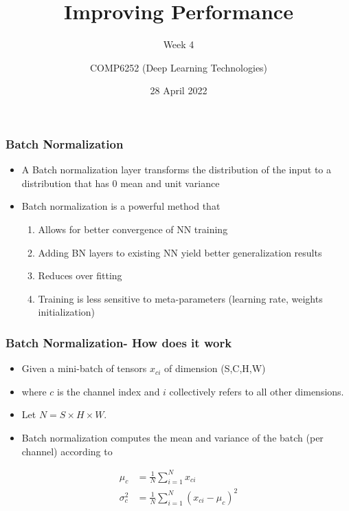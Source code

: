 \documentclass{beamer}
\begin{document}
\title{Improving Performance}
\subtitle{Week 4}
\author{COMP6252 (Deep Learning Technologies)}
 \date{28 April 2022}

\begin{frame}
    \placelogofalse %
    \titlepage
\end{frame}
    
\placelogotrue
\begin{frame}
    \frametitle{Batch Normalization}
\begin{itemize}
    \item A Batch normalization layer transforms the distribution of the input to a distribution that has 0 mean and unit variance
    \item Batch normalization is a powerful method that 
    \begin{enumerate}
        \item Allows for better convergence of NN training 
        \item Adding BN layers to existing NN yield better generalization results
        \item Reduces over fitting
        \item Training is less sensitive to meta-parameters (learning rate, weights initialization)
    \end{enumerate}
    
\end{itemize}
    

\end{frame}
\begin{frame}
    \frametitle{Batch Normalization- How does it work}
    \begin{itemize}
        \item Given a mini-batch of tensors $x_{ci}$ of dimension (S,C,H,W)
        \item  where $c$ is the channel index and $i$ collectively refers to all other dimensions. 
        \item  Let $N=S\times H\times W$.
        \item Batch normalization computes the mean and variance of the batch (per channel) according to
    \end{itemize}
        \begin{align*}
        \mu_c&=\frac{1}{N}\sum_{i=1}^N x_{ci}\\
        \sigma^2_c&=\frac{1}{N}\sum_{i=1}^N \left(x_{ci}-\mu_c\right)^2
        \end{align*}
    
    
    
    
\end{frame}
\end{document}
